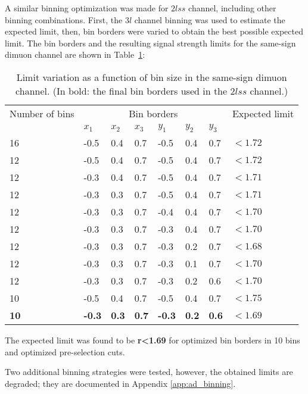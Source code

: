A similar binning optimization was made for $2lss$ channel, including other binning combinations. First, the $3l$ channel binning was used to estimate the expected limit, then, bin borders were varied to obtain the best possible expected limit. The bin borders and the resulting signal strength limits for the same-sign dimuon channel are shown in Table~\ref{bin_limits_2lss}:

\begin{table}[h!]
\centering
\begin{tabular}{llllllll}\hline
Number of bins  & \multicolumn{6}{c}{Bin borders}  & Expected limit \\
                &$x_1$&$x_2$&$x_3$&$y_1$&$y_2$&$y_3$&\\\hline
16              &-0.5 & 0.4 & 0.7 &-0.5 & 0.4 & 0.7 & $<1.72$\\
12              &-0.5 & 0.4 & 0.7 &-0.5 & 0.4 & 0.7 & $<1.72$\\
12              &-0.3 & 0.4 & 0.7 &-0.5 & 0.4 & 0.7 & $<1.71$\\
12              &-0.3 & 0.3 & 0.7 &-0.5 & 0.4 & 0.7 & $<1.71$\\
12              &-0.3 & 0.3 & 0.7 &-0.4 & 0.4 & 0.7 & $<1.70$\\
12              &-0.3 & 0.3 & 0.7 &-0.3 & 0.4 & 0.7 & $<1.70$\\
12              &-0.3 & 0.3 & 0.7 &-0.3 & 0.2 & 0.7 & $<1.68$\\
12              &-0.3 & 0.3 & 0.7 &-0.3 & 0.1 & 0.7 & $<1.70$\\
12              &-0.3 & 0.3 & 0.7 &-0.3 & 0.2 & 0.6 & $<1.70$\\
10              &-0.5 & 0.4 & 0.7 &-0.5 & 0.4 & 0.7 & $<1.75$\\
\textbf{10}     &\textbf{-0.3} &\textbf{ 0.3} &\textbf{ 0.7} &\textbf{-0.3} &\textbf{ 0.2} &\textbf{ 0.6} &$\mathbf{<1.69}$\\\hline
\end{tabular}
\caption{Limit variation as a function of bin size in the same-sign dimuon channel. (In bold: the final bin borders used in the $2lss$ channel.)}
\label{bin_limits_2lss}
\end{table}

The expected limit was found to be \textbf{r<1.69} for optimized bin borders in 10 bins and optimized pre-selection cuts.

Two additional binning strategies were tested, however, the obtained limits are degraded; they are documented in Appendix \ref{app:ad_binning}.   

